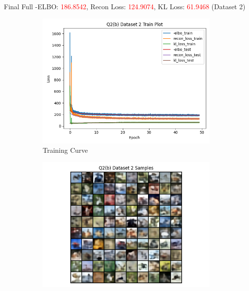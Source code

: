 \documentclass{article}
\begin{document}
\begin{enumerate}[(a)]
           \newpage

           Final Full -ELBO: \textcolor{red}{186.8542}, Recon Loss: \textcolor{red}{124.9074}, KL Loss: \textcolor{red}{61.9468} (Dataset 2)
           \begin{figure}[H]
                  \centering
                  \begin{subfigure}[b]{0.475\textwidth}
                      \centering
                      \includegraphics[width=\textwidth]{figures/q2_b_dset2_train_plot.png}
                      \caption{Training Curve}
                  \end{subfigure}
                  \hfill
                  \begin{subfigure}[b]{0.475\textwidth}
                      \centering
                      \includegraphics[width=\textwidth]{figures/q2_b_dset2_samples.png}

\end{subfigure}
\end{figure}
\end{enumerate}
\end{document}
